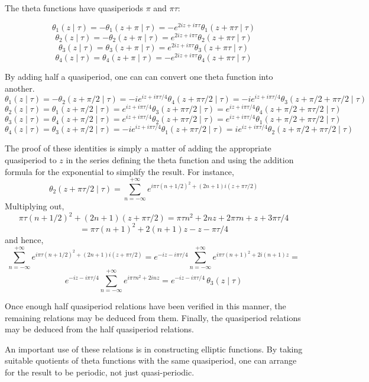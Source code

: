 \documentclass[12pt]{article}
\begin{document}
The theta functions have quasiperiods $\pi$ and $\pi \tau$:

$$\theta_1 (z \mid \tau) = -\theta_1 (z + \pi \mid \tau) = -e^{2 i z + i \pi \tau} \theta_1 (z + \pi \tau \mid \tau)$$
$$\theta_2 (z \mid \tau) = -\theta_2 (z + \pi \mid \tau) = e^{2 i z + i \pi \tau} \theta_2 (z + \pi \tau \mid \tau)$$
$$\theta_3 (z \mid \tau) = \theta_3 (z + \pi \mid \tau) = e^{2 i z + i \pi \tau} \theta_3 (z + \pi \tau \mid \tau)$$
$$\theta_4 (z \mid \tau) = \theta_4 (z + \pi \mid \tau) = -e^{2 i z + i \pi \tau} \theta_4 (z + \pi \tau \mid \tau)$$

By adding half a quasiperiod, one can can convert one theta function into another.
$$\theta_1 (z \mid \tau) = -\theta_2 (z + \pi / 2 \mid \tau) = -i e^{i z + i \pi \tau / 4} \theta_4 (z + \pi \tau / 2 \mid \tau) = -i e^{i z + i \pi \tau / 4} \theta_3 (z + \pi / 2 + \pi \tau / 2 \mid \tau)$$
$$\theta_2 (z \mid \tau) = \theta_1 (z + \pi / 2 \mid \tau) = e^{i z + i \pi \tau / 4} \theta_3 (z + \pi \tau / 2 \mid \tau) = e^{i z + i \pi \tau / 4} \theta_4 (z + \pi / 2 + \pi \tau / 2 \mid \tau)$$
$$\theta_3 (z \mid \tau) = \theta_4 (z + \pi / 2 \mid \tau) = e^{i z + i \pi \tau / 4} \theta_2 (z + \pi \tau / 2 \mid \tau) = e^{i z + i \pi \tau / 4} \theta_1 (z + \pi / 2 + \pi \tau / 2 \mid \tau)$$
$$\theta_4 (z \mid \tau) = \theta_3 (z + \pi / 2 \mid \tau) = -i e^{i z + i \pi \tau / 4} \theta_1 (z + \pi \tau / 2 \mid \tau) = i e^{i z + i \pi \tau / 4} \theta_2 (z + \pi / 2 + \pi \tau / 2 \mid \tau)$$

The proof of these identities is simply a matter of adding the appropriate quasiperiod to $z$ in the series defining the theta function and using the addition formula for the exponential to simplify the result.  For instance,
 $$\theta_2 (z + \pi \tau / 2 \mid \tau) = \sum_{n = -\infty}^{+\infty} e^{i \pi \tau (n + 1/2)^2 + (2n+1) i (z + \pi \tau / 2)}$$
 Multiplying out,
$$ \pi \tau (n + 1/2)^2 + (2n+1) (z + \pi \tau / 2) = \pi \tau n^2 + 2 n z + 2 \pi \tau n + z + 3 \pi \tau / 4$$
$$ = \pi \tau (n+1)^2 + 2 (n+1) z - z - \pi \tau / 4$$
and hence,
 $$\sum_{n = -\infty}^{+\infty} e^{i \pi \tau (n + 1/2)^2 + (2n+1) i (z + \pi \tau / 2)} = e^{- i z - i \pi \tau / 4} \sum_{n = -\infty}^{+\infty} e^{i \pi \tau (n+1)^2 + 2 i (n+1) z} =$$
 $$e^{- i z - i \pi \tau / 4} \sum_{n = -\infty}^{+\infty} e^{i \pi \tau n^2 + 2 i n z} = e^{- i z - i \pi \tau / 4} \, \theta_3 (z \mid \tau)$$

Once enough half quasiperiod relations have been verified in this manner, the remaining relations may be deduced from them.  Finally, the quasiperiod relations may be deduced from the half quasiperiod relations.

An important use of these relations is in constructing elliptic functions.  By taking suitable quotients of theta functions with the same quasiperiod, one can arrange for the result to be periodic, not just quasi-periodic.
\end{document}
